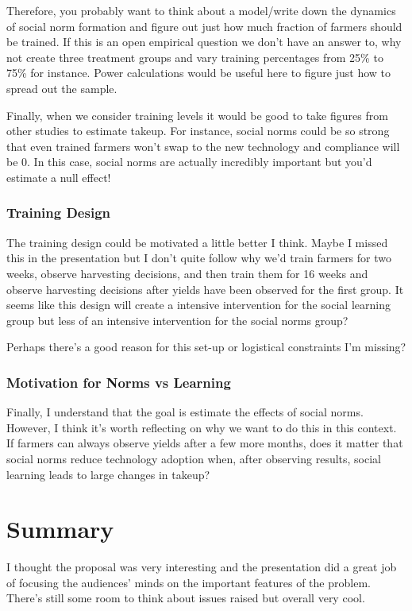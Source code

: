 \documentclass{article}
\begin{document}
Therefore, you probably want to think about a model/write down the dynamics of
social norm formation and figure out just how much fraction of farmers should 
be trained. If this is an open empirical question we don't have an answer to, 
why not create three treatment groups and vary training percentages from 25\% to 
75\% for instance. Power calculations would be useful here to figure just how 
to spread out the sample.



Finally, when we consider training levels it would be good to take figures from 
other studies to estimate takeup. For instance, social norms could be so strong 
that even trained farmers won't swap to the new technology and compliance will be 0. In this 
case, social norms are actually incredibly important but you'd estimate a null 
effect!




\subsubsection*{Training Design}

The training design could be motivated a little better I think. Maybe I missed 
this in the presentation but I don't quite follow why we'd train farmers for two 
weeks, observe harvesting decisions, and then train them for 16 weeks and observe 
harvesting decisions after yields have been observed for the first group. It 
seems like this design will create a intensive intervention for the social 
learning group but less of an intensive intervention for the social norms 
group?


Perhaps there's a good reason for this set-up or logistical constraints I'm missing?



\subsubsection*{Motivation for Norms vs Learning}
Finally, I understand that the goal is estimate the effects of social norms. However,
I think it's worth reflecting on why we want to do this in this context. If farmers 
can always observe yields after a few more months, does it matter that social norms
reduce technology adoption when, after observing results, social learning leads to 
large changes in takeup?

   
\section*{Summary}


I thought the proposal was very interesting and the presentation did a great job 
of focusing the audiences' minds on the important features of the problem. There's 
still some room to think about issues raised but overall very cool. 
\end{document}
